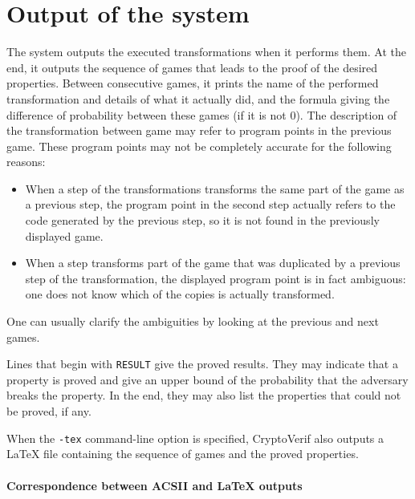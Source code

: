 \documentclass{article}
\begin{document}
\section{Output of the system}

The system outputs the executed transformations when it performs
them. At the end, it outputs the sequence of games that leads to the
proof of the desired properties. Between consecutive games, it prints
the name of the performed transformation and details of what it
actually did, and the formula giving the difference of probability
between these games (if it is not 0).
The description of the transformation between game may refer to 
program points in the previous game. These program points may not be
completely accurate for the following reasons:
\begin{itemize}
\item When a step of the transformations transforms the same part of 
the game as a previous step, the program point in the second step actually
refers to the code generated by the previous step, so it is not found
in the previously displayed game.
\item When a step transforms part of the game that was duplicated by
a previous step of the transformation, the displayed program point
is in fact ambiguous: one does not know which of the copies is actually
transformed.
\end{itemize}
One can usually clarify the ambiguities by looking at the previous and
next games. 

Lines that begin with \texttt{RESULT} give the proved results.
They may indicate that a property is proved and give 
an upper bound of the probability that the adversary breaks
the property. 
%
In the end, they may also list the properties that could not be
proved, if any.

When the \texttt{-tex} command-line option is specified,
CryptoVerif also outputs a {\LaTeX} file containing the 
sequence of games and the proved properties.

\paragraph{Correspondence between ACSII and {\LaTeX} outputs}
\end{document}
